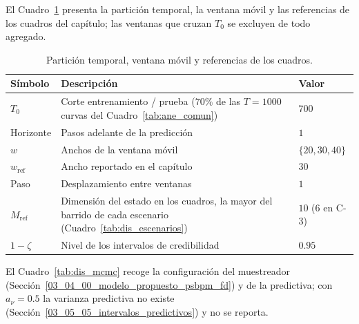 El Cuadro~\ref{tab:dis_particion} presenta la partición temporal, la ventana móvil y las referencias de los cuadros del capítulo; las ventanas que cruzan $T_0$ se excluyen de todo agregado.

\begin{table}[H]
\centering\small
\caption{Partición temporal, ventana móvil y referencias de los cuadros.}
\label{tab:dis_particion}
\begin{tabular}{p{} p{} p{}}
\hline
Símbolo & Descripción & Valor \\
\hline
$T_0$              & Corte entrenamiento / prueba ($70\%$ de las $T = 1000$ curvas del Cuadro~\ref{tab:ane_comun}) & $700$ \\
Horizonte          & Pasos adelante de la predicción                 & $1$ \\
$w$                & Anchos de la ventana móvil                      & $\{20, 30, 40\}$ \\
$w_{\mathrm{ref}}$ & Ancho reportado en el capítulo                  & $30$ \\
Paso               & Desplazamiento entre ventanas                   & $1$ \\
$M_{\mathrm{ref}}$ & Dimensión del estado en los cuadros, la mayor del barrido de cada escenario (Cuadro~\ref{tab:dis_escenarios}) & $10$ ($6$ en C-3) \\
$1-\zeta$          & Nivel de los intervalos de credibilidad         & $0.95$ \\
\hline
\end{tabular}
\end{table}

El Cuadro~\ref{tab:dis_mcmc} recoge la configuración del muestreador (Sección~\ref{03_04_00_modelo_propuesto_psbpm_fd}) y de la predictiva; con $a_\nu = 0.5$ la varianza predictiva no existe (Sección~\ref{03_05_05_intervalos_predictivos}) y no se reporta.


